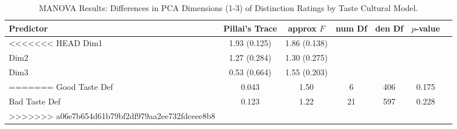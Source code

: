 \begin{table}[htpb]
\centering
\begin{tabular}{lcccccc}
\toprule
Predictor & Pillai's Trace & approx $F$ & num Df & den Df & $p$-value \\
\midrule
<<<<<<< HEAD
Dim1 & 1.93 (0.125) & 1.86 (0.138) \\
Dim2 & 1.27 (0.284) & 1.30 (0.275) \\
Dim3 & 0.53 (0.664) & 1.55 (0.203) \\
=======
Good Taste Def & 0.043 & 1.50 & 6 & 406 & 0.175 \\
Bad Taste Def & 0.123 & 1.22 & 21 & 597 & 0.228 \\
>>>>>>> a06e7b654d61b79bf2df979aa2ee732fdceee8b8
\bottomrule
\multicolumn{6}{l}{\footnotesize $^{*}p<0.05; ^{**}p<0.01; ^{***}p<0.001$} \\
\end{tabular}
\caption{MANOVA Results: Differences in PCA Dimensions (1-3) of Distinction Ratings by Taste Cultural Model.}
\label{tab:anova_pca}
\end{table}

